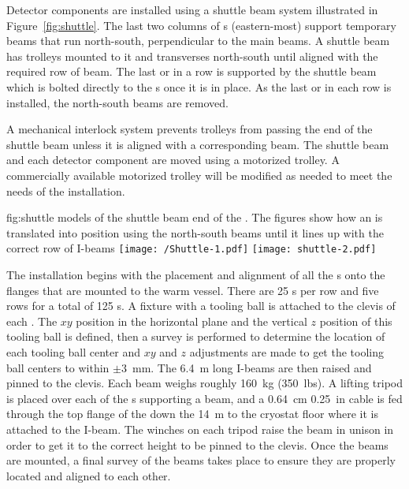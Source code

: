 Detector components are installed using a shuttle beam system
illustrated in Figure~\ref{fig:shuttle}.  The last two columns of
\fdth{}s (eastern-most) support temporary beams that run
north-south, perpendicular to the main  beams.  A shuttle
beam
has trolleys mounted to it and transverses 
north-south until aligned with the required row of  beam.  The last
 or  in a row is supported by the shuttle beam which is bolted
directly to the \fdth{}s once it is in place.  As the last  or
 in each row is installed, the north-south beams are removed.

A mechanical interlock system  prevents trolleys
from passing the end of the shuttle beam unless it is aligned with a
corresponding  beam.  The shuttle beam and each detector component are
moved using a motorized trolley.  A commercially available motorized
trolley will be modified as needed to meet the needs of the
installation.

\begin{dunefigure}{fig:shuttle}
  {\threed models of the shuttle beam end of the . The figures show how an 
is translated into position using the north-south beams until it lines up with the correct
row of I-beams}
\texttt{[image: /Shuttle-1.pdf]}
 \texttt{[image: shuttle-2.pdf]}
\end{dunefigure}


The  installation begins with the placement and alignment of all
the \fdth{}s onto the flanges that are mounted to the warm vessel.
There are \num{25} \fdth{}s per row and five rows for a total of \num{125}
\fdth{}s.  A fixture with a tooling ball is attached to the
clevis of each \fdth.  The $xy$ position in the horizontal plane
and the vertical $z$ position of this tooling ball is defined, then a %
survey is performed to determine the location of each tooling
ball center and $xy$ and $z$ adjustments are made to get the tooling
ball centers to within $\pm$\SI{3}{mm}.  The \SI{6.4}{m} long I-beams are then 
raised and pinned to the clevis.  Each beam weighs roughly \SI{160}{kg} (\SI{350}{lbs}).
A lifting tripod is placed over each of the \fdth{}s
supporting a beam, and a \SI{0.64}{cm} \SI{0.25}{in}  %
cable is fed through the top
flange of the \fdth down the \SI{14}{m} to the cryostat floor where it
is attached to the I-beam.  The winches on each tripod raise
the beam in unison in order to get it to the correct height to be
pinned to the \fdth clevis.  Once the beams are mounted, a final
survey of the beams takes place to ensure they are properly located and aligned
to each other.

